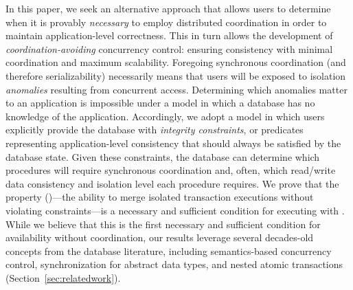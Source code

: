 In this paper, we seek an alternative approach that allows users to
determine when it is provably \textit{necessary} to employ distributed
coordination in order to maintain application-level correctness. This
in turn allows the development of \textit{coordination-avoiding}
concurrency control: ensuring consistency with minimal coordination
and maximum scalability. Foregoing synchronous coordination (and
therefore serializability) necessarily means that users will be
exposed to isolation \textit{anomalies} resulting from concurrent
access. Determining which anomalies matter to an application is
impossible under a model in which a database has no knowledge of the
application. Accordingly, we adopt a model in which users explicitly
provide the database with \textit{integrity constraints}, or
predicates representing application-level consistency that should
always be satisfied by the database state. Given these constraints,
the database can determine which procedures will require synchronous
coordination and, often, which read/write data consistency and
isolation level each procedure requires. We prove that the
\textit{\fullnameconfluence} property (\iconfluence)---the ability to
merge isolated transaction executions without violating
constraints---is a necessary and sufficient condition for executing
with \cfreedom. While we believe that this is the first necessary and
sufficient condition for availability without coordination, our
results leverage several decades-old concepts from the database
literature, including semantics-based concurrency control,
synchronization for abstract data types, and nested atomic
transactions (Section~\ref{sec:relatedwork}).

